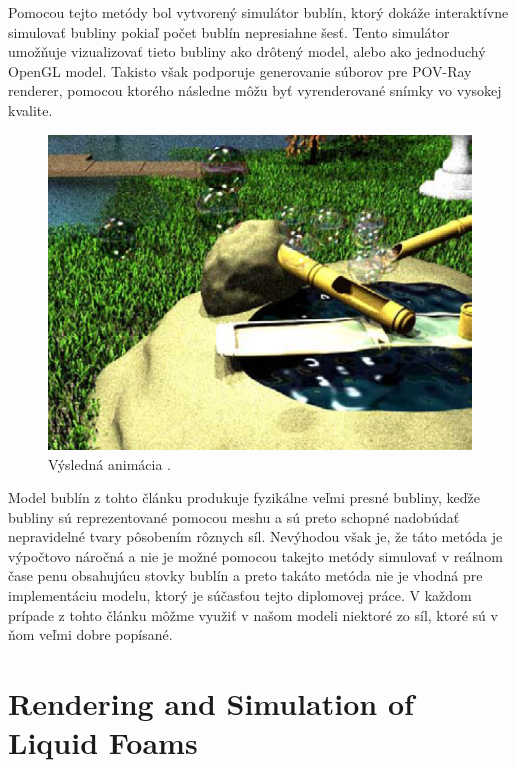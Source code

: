 Pomocou tejto metódy bol vytvorený simulátor bublín, ktorý dokáže interaktívne simulovať bubliny pokiaľ počet bublín nepresiahne šesť. Tento simulátor umožňuje vizualizovať tieto bubliny ako drôtený model, alebo ako jednoduchý OpenGL model. Takisto však podporuje generovanie súborov pre POV-Ray renderer, pomocou ktorého následne môžu byť vyrenderované snímky vo vysokej kvalite.
\begin{figure}[H]
	\begin{center}
		\includegraphics[height=\imageHeight]{images/durikovic/result_animation}
		\caption{Výsledná animácia \cite{durikovic2001}.}
	\end{center}
\end{figure}

Model bublín z tohto článku produkuje fyzikálne veľmi presné bubliny, keďže bubliny sú reprezentované pomocou meshu a sú preto schopné nadobúdať nepravidelné tvary pôsobením rôznych síl. Nevýhodou však je, že táto metóda je výpočtovo náročná a nie je možné pomocou takejto metódy simulovať v reálnom čase penu obsahujúcu stovky bublín a preto takáto metóda nie je vhodná pre implementáciu modelu, ktorý je súčasťou tejto diplomovej práce. V každom prípade z tohto článku môžme využiť v našom modeli niektoré zo síl, ktoré sú v ňom veľmi dobre popísané.

\section{Rendering and Simulation of Liquid Foams \cite{sunkel2004}}

